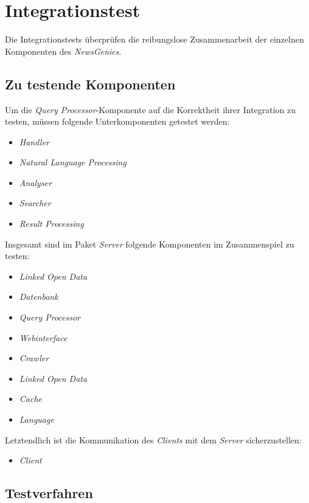 
\chapter{Integrationstest}

Die Integrationstests überprüfen die reibungslose Zusammenarbeit der einzelnen Komponenten des \textit{NewsGenies}.

\section{Zu testende Komponenten}

Um die \textit{Query Processor}-Komponente auf die Korrektheit ihrer Integration
zu testen, müssen folgende Unterkomponenten getestet werden:
\begin{itemize}
\item \textit{Handler}
\item \textit{Natural Language Processing}
\item \textit{Analyser}
\item \textit{Searcher}
\item \textit{Result Processing}
\end{itemize}

Insgesamt sind im Paket \textit{Server} folgende Komponenten im
Zusammenspiel zu testen:
\begin{itemize}
\item \textit{Linked Open Data}
\item \textit{Datenbank}
\item \textit{Query Processor}
\item \textit{Webinterface}
\item \textit{Crawler}
\item \textit{Linked Open Data}
\item \textit{Cache}
\item \textit{Language}
\end{itemize}

Letztendlich ist die Kommunikation des \textit{Clients} mit dem \textit{Server} sicherzustellen:
\begin{itemize}
\item \textit{Client}
\end{itemize}

\section{Testverfahren}

